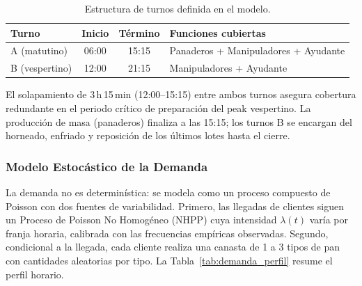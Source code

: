 \documentclass[10pt, a4paper]{article}
\begin{document}
\begin{table}[H]
\centering
\caption{Estructura de turnos definida en el modelo.}
\label{tab:turnos}
\renewcommand{\arraystretch}{1.20}
\begin{tabular}{l c c l}
\toprule
\rowcolor{azulClaro}
\textbf{Turno} & \textbf{Inicio} & \textbf{T\'ermino} & \textbf{Funciones cubiertas} \\
\midrule
A (matutino)   & 06:00 & 15:15 & Panaderos + Manipuladores + Ayudante \\
\rowcolor{grisClaro}
B (vespertino) & 12:00 & 21:15 & Manipuladores + Ayudante \\
\bottomrule
\end{tabular}
\end{table}

El solapamiento de 3\,h\,15\,min (12:00--15:15) entre ambos turnos
asegura cobertura redundante en el periodo cr\'itico de preparaci\'on del peak
vespertino. La producci\'on de masa (panaderos) finaliza a las 15:15; los
turnos B se encargan del horneado, enfriado y reposici\'on de los \'ultimos
lotes hasta el cierre.

\subsubsection{Modelo Estoc\'astico de la Demanda}

La demanda no es determin\'istica: se modela como un proceso compuesto de
Poisson con dos fuentes de variabilidad. Primero, las llegadas de clientes
siguen un Proceso de Poisson No Homog\'eneo (NHPP) cuya intensidad $\lambda(t)$
var\'ia por franja horaria, calibrada con las frecuencias emp\'iricas
observadas. Segundo, condicional a la llegada, cada cliente realiza una canasta
de 1 a 3 tipos de pan con cantidades aleatorias por tipo. La
Tabla~\ref{tab:demanda_perfil} resume el perfil horario.
\end{document}
